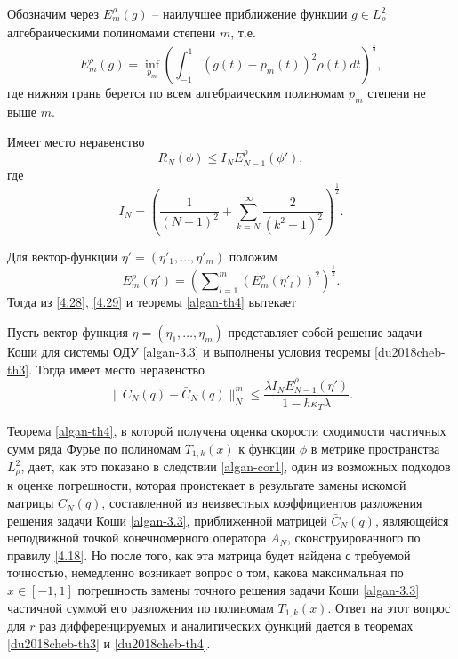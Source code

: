 Обозначим через $E^\rho_ m(g)$ -- наилучшее приближение функции $g\in L^2_\rho$ алгебраическими полиномами степени $m$, т.е.
$$
 E^\rho_ m(g)=\inf_{p_m}\left(\int_{-1}^1(g(t)- p_m(t))^2 \rho(t)dt\right)^\frac12,
$$
где нижняя грань берется по всем алгебраическим полиномам $p_m$ степени не выше $m$.

\begin{theorem}\label{algan-th4}
     Имеет место  неравенство
$$
R_N(\phi)\le I_NE^\rho_ {N-1}(\phi'),
$$
где
$$
I_N=\left(\frac{1}{(N-1)^2}+\sum_{k=N}^{\infty}\frac{2}{(k^2-1)^2}\right)^\frac12.
 $$
\end{theorem}

Для вектор-функции $\eta'=(\eta'_1,\ldots,\eta'_m)$ положим
$$
E^\rho_ m(\eta')=\left(\sum\nolimits_{l=1}^m (E^\rho_ m(\eta'_l))^2\right)^\frac12.
$$
Тогда из \eqref{4.28}, \eqref{4.29} и теоремы \ref{algan-th4} вытекает
\begin{corollary}\label{algan-cor1}
  Пусть вектор-функция $\eta=(\eta_1,\ldots,\eta_m)$ представляет собой решение задачи Коши для системы ОДУ \eqref{algan-3.3} и выполнены условия теоремы \ref{du2018cheb-th3}. Тогда имеет место неравенство
$$
\|C_N(q)-\bar C_N(q)\|_N^m\le \frac{\lambda I_NE^\rho_{N-1}(\eta') }{1-h\kappa_T\lambda}.
$$
  \end{corollary}

Теорема \ref{algan-th4}, в которой получена оценка скорости сходимости частичных сумм  ряда Фурье по полиномам  $T_{1,k}(x)$ к функции $\phi$ в метрике пространства $L^2_\rho$, дает, как это показано в следствии \ref{algan-cor1}, один из возможных подходов к оценке погрешности, которая проистекает в результате замены искомой матрицы $C_N(q)$, составленной из неизвестных коэффициентов  разложения решения задачи Коши \eqref{algan-3.3}, приближенной матрицей $\bar C_N(q)$, являющейся неподвижной точкой конечномерного оператора $A_N$, сконструированного по правилу \eqref{4.18}. Но после того, как эта матрица будет  найдена с требуемой точностью, немедленно возникает вопрос о том, какова максимальная по $x\in[-1,1]$ погрешность замены точного решения  задачи Коши \eqref{algan-3.3} частичной суммой его разложения по полиномам $T_{1,k}(x)$. Ответ на этот вопрос для $r$ раз дифференцируемых и аналитических функций дается в теоремах \ref{du2018cheb-th3} и \ref{du2018cheb-th4}.

